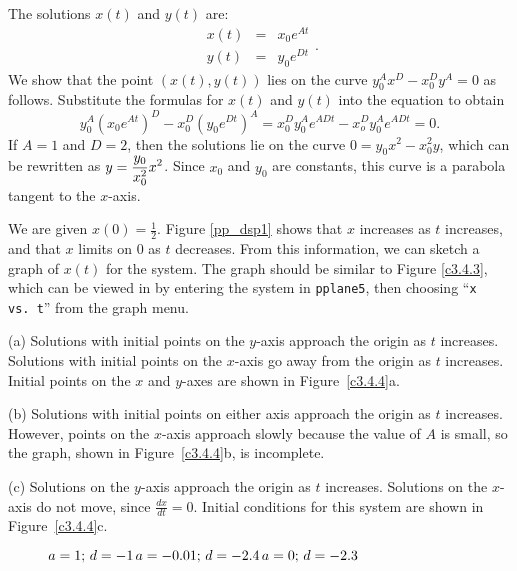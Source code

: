 \documentclass{ximera}
\begin{document}
The solutions $x(t)$ and $y(t)$ are:
\[
\begin{array}{rcl}
x(t) & = & x_0e^{At} \\
y(t) & = & y_0e^{Dt}\end{array}.
\]
We show that the point $(x(t),y(t))$ lies on the curve
$y_0^Ax^D - x_0^Dy^A = 0$ as follows.  Substitute the formulas for
$x(t)$ and $y(t)$ into the equation to obtain
\[
y_0^A\left(x_0e^{At}\right)^D - x_0^D\left(y_0e^{Dt}\right)^A =
x_0^Dy_0^Ae^{ADt} - x_o^Dy_0^Ae^{ADt} = 0.
\]
If $A = 1$ and $D = 2$, then the solutions lie on the curve
$0 = y_0x^2 - x_0^2y$, which can be rewritten as
$y = \displaystyle \frac{y_0}{x_0^2}x^2$.
Since $x_0$ and $y_0$ are constants, this curve is a parabola
tangent to the $x$-axis.

We are given $x(0) = \frac{1}{2}$.  Figure \ref{pp_dsp1}
shows that $x$ increases as $t$
increases, and that $x$ limits on $0$ as $t$ decreases.  From
this information, we can sketch a graph of $x(t)$ for the system.
The graph should be similar to Figure \ref{c3.4.3}, which can
be viewed in \Matlab by entering the system in {\tt pplane5},
then choosing ``{\tt x vs.\ t}'' from the graph menu.

\begin{figure}[htb]
                       \centerline{%
                       }
\end{figure}

(a) Solutions with initial points on the $y$-axis approach the
origin as $t$ increases.  Solutions with initial points on the
$x$-axis go away from the origin as $t$ increases.  Initial points
on the $x$ and $y$-axes are shown in Figure~\ref{c3.4.4}a.

(b) Solutions with initial points on either axis approach the
origin as $t$ increases.  However, points on the $x$-axis
approach slowly because the value of $A$ is small, so the \Matlab
graph, shown in Figure~\ref{c3.4.4}b, is incomplete.

(c) Solutions on the $y$-axis approach the origin as $t$
increases.  Solutions on the $x$-axis do not move, since
$\frac{dx}{dt} = 0$.  Initial conditions for this system are shown
in Figure~\ref{c3.4.4}c.

\begin{figure}[htb]
                       \centerline{%
                       }
	\centerline{$a = 1\hbox{; }d = -1$\hspace{0.7in}$a = -0.01\hbox{; }d = -2.4$\hspace{0.7in}$a = 0\hbox{; }d = -2.3$}
\end{figure}
\end{document}
